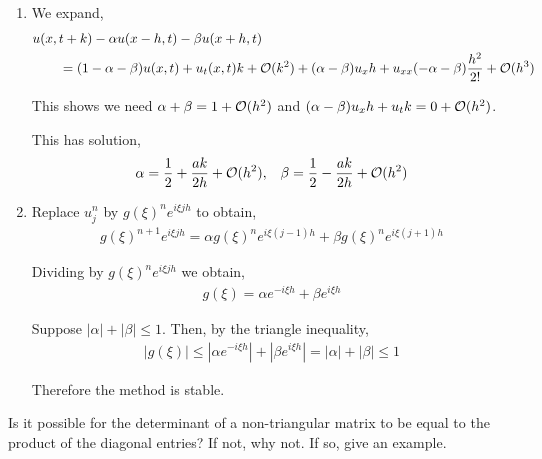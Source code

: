 \documentclass[10pt]{article}
\begin{document}
\begin{solution}[Solution]
\begin{enumerate}[label=(\alph*)]
    \item
        We expand,
        \begin{align*}
            &u(x,t+k) - \alpha u(x-h,t) - \beta u(x+h,t)
            \\&\hspace{2em}= (1-\alpha-\beta) u(x,t) + u_t(x,t) k + \mathcal{O}(k^2) 
            + (\alpha-\beta)u_x h + u_{xx}(-\alpha-\beta) \frac{h^2}{2!} + \mathcal{O}(h^3)
        \end{align*}
        
        This shows we need \( \alpha + \beta = 1 + \mathcal{O}(h^2) \) and \( (\alpha-\beta)u_x h +u_tk = 0 + \mathcal{O}(h^2) \).

        This has solution,
        \begin{align*}
            \alpha = \frac{1}{2} + \frac{ak}{2h} + \mathcal{O}(h^2), &&
            \beta = \frac{1}{2} - \frac{ak}{2h} + \mathcal{O}(h^2)
        \end{align*}
        


    \item Replace \( u_j^n \) by \( g(\xi)^n e^{i\xi j h} \) to obtain,
        \begin{align*}
            g(\xi)^{n+1} e^{i\xi jh} = \alpha g(\xi)^n e^{i\xi(j-1)h} + \beta g(\xi)^n e^{i\xi(j+1)h}
        \end{align*}

        Dividing by \( g(\xi)^n e^{i\xi j h} \) we obtain,
        \begin{align*}
            g(\xi) = \alpha e^{-i\xi h} + \beta e^{i\xi h}
        \end{align*}
        
        Suppose \( |\alpha|+|\beta| \leq 1 \). Then, by the triangle inequality,
        \begin{align*}
            |g(\xi)| \leq \left|\alpha e^{-i\xi h}\right| + \left| \beta e^{i\xi h} \right|
            = |\alpha| + |\beta| \leq 1
        \end{align*}

        Therefore the method is stable.
        
\end{enumerate}
\end{solution}

\begin{problem}
Is it possible for the determinant of a non-triangular matrix to be equal to the product of the diagonal entries? If not, why not. If so, give an example.
\end{problem}
\end{document}
